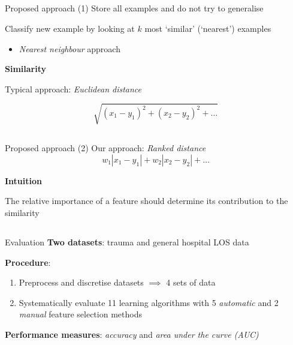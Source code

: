 \documentclass[compress]{beamer}
\begin{document}
\subsection{}
\begin{frame}{Proposed approach (1)}
Store all examples and do not try to generalise

Classify new example by looking at $k$ most `similar' (`nearest') examples
\begin{itemize}
\item \textit{Nearest neighbour} approach
\end{itemize}

\vspace{0.5cm}
\textbf{Similarity}

Typical approach: \textit{Euclidean distance}

\begin{equation*}
\sqrt{(x_1-y_1)^2 + (x_2-y_2)^2 + \ldots}
\end{equation*}
\end{frame}

\subsection{}
\begin{frame}{Proposed approach (2)}
Our approach: \textit{Ranked distance}
\begin{equation*}
w_1|x_1-y_1| + w_2|x_2-y_2| + \ldots
\end{equation*}

\vspace{0.5cm}
\textbf{Intuition}

The relative importance of a feature should determine its contribution to the similarity
\end{frame}

\subsection{}
\begin{frame}{Evaluation}
\textbf{Two datasets}: trauma and general hospital LOS data

\vspace{0.5cm}

\textbf{Procedure}:
\begin{enumerate}
\item Preprocess and discretise datasets $\implies$ 4 sets of data
\item Systematically evaluate 11 learning algorithms with 5 \textit{automatic} and 2 \textit{manual} feature selection methods
\end{enumerate}

\vspace{0.5cm}

  \pause
\textbf{Performance measures}: \textit{accuracy} and \textit{area under the curve (AUC)}
\end{frame}
\end{document}

